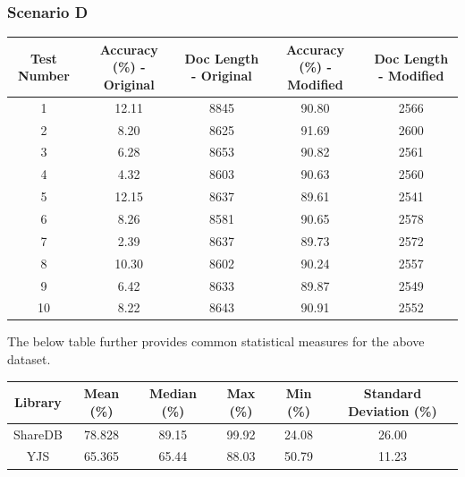 \documentclass[9pt, titlepage]{article}
\begin{document}
  \subsubsection{Scenario D}
  
  \begin{center}
    \begin{tabular}{||c c c c c||} 
      \hline
      Test Number & Accuracy (\%) - Original & Doc Length - Original & Accuracy (\%) - Modified & Doc Length - Modified \\ [0.5ex] 
      \hline\hline
      1 & 12.11 & 8845 & 90.80 & 2566 \\ 
      \hline
      2 &  8.20 & 8625 & 91.69 & 2600 \\ 
      \hline
      3 &  6.28 & 8653 & 90.82 & 2561 \\ 
      \hline
      4 &  4.32 & 8603 & 90.63 & 2560 \\ 
      \hline
      5 & 12.15 & 8637 & 89.61 & 2541 \\ 
      \hline
      6 &  8.26 & 8581 & 90.65 & 2578 \\ 
      \hline
      7 &  2.39 & 8637 & 89.73 & 2572 \\ 
      \hline
      8 & 10.30 & 8602 & 90.24 & 2557 \\ 
      \hline
      9 &  6.42 & 8633 & 89.87 & 2549 \\ 
      \hline
      10 & 8.22 & 8643 & 90.91 & 2552 \\ 
      \hline
    \end{tabular}
  \end{center}
  
  The below table further provides common statistical measures for the above dataset.\\

  \begin{center}
    \begin{tabular}{||c c c c c c||} 
      \hline
      Library & Mean (\%) & Median (\%) & Max (\%) & Min (\%) & Standard Deviation (\%) \\ [0.5ex] 
      \hline\hline
      ShareDB & 78.828 & 89.15 & 99.92 & 24.08 & 26.00 \\ 
      \hline
      YJS & 65.365 & 65.44 & 88.03 & 50.79 & 11.23 \\
      \hline
    \end{tabular}
  \end{center}
  \hfill

  \break
\end{document}
